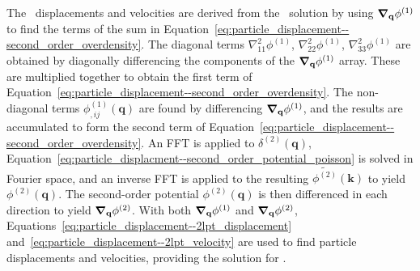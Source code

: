 The \lpt\ displacements and velocities are derived from the \za\ solution by using ${\boldsymbol{\nabla}}_{\mathbf{q}} \phi^{(1)}$ to find the terms of the sum in Equation~\ref{eq:particle_displacement--second_order_overdensity}.  The diagonal terms $\nabla_{11}^{2} \phi^{(1)}$, $\nabla_{22}^{2} \phi^{(1)}$, $\nabla_{33}^{2} \phi^{(1)}$ are obtained by diagonally differencing the components of the ${\boldsymbol{\nabla}}_{\mathbf{q}} \phi^{(1)}$ array.  These are multiplied together to obtain the first term of Equation~\ref{eq:particle_displacement--second_order_overdensity}.  The non-diagonal terms $\phi_{,ij}^{(1)}(\mathbf{q})$ are found by differencing ${\boldsymbol{\nabla}}_{\mathbf{q}} \phi^{(1)}$, and the results are accumulated to form the second term of Equation~\ref{eq:particle_displacement--second_order_overdensity}.  An FFT is applied to $\delta^{(2)}(\mathbf{q})$, Equation~\ref{eq:particle_displacment--second_order_potential_poisson} is solved in Fourier space, and an inverse FFT is applied to the resulting $\tilde{\phi^{(2)}}(\mathbf{k})$ to yield $\phi^{(2)}(\mathbf{q})$.  The second-order potential $\phi^{(2)}(\mathbf{q})$ is then differenced in each direction to yield ${\boldsymbol{\nabla}}_{\mathbf{q}} \phi^{(2)}$.  With both ${\boldsymbol{\nabla}}_{\mathbf{q}} \phi^{(1)}$ and ${\boldsymbol{\nabla}}_{\mathbf{q}} \phi^{(2)}$, Equations~\ref{eq:particle_displacement--2lpt_displacement} and~\ref{eq:particle_displacement--2lpt_velocity} are used to find particle displacements and velocities, providing the solution for \lpt.



